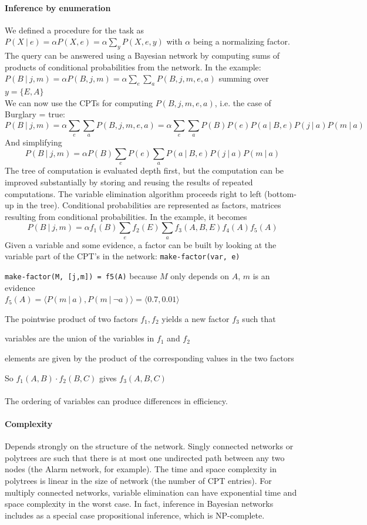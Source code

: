 \documentclass[10pt]{report}
\begin{document}
\paragraph{Inference by enumeration} We defined a procedure for the task as $P(X\:|\:e)=\alpha P(X,e) = \alpha\sum_y P(X,e,y)$ with $\alpha$ being a normalizing factor.\\
The query can be answered using a Bayesian network by computing sums of products of conditional probabilities from the network. In the example: $P(B\:|\:j,m) = \alpha P(B,j,m) = \alpha\sum_e\sum_a P(B,j,m,e,a)$ summing over $y=\{E,A\}$\\
We can now use the CPTs for computing $P(B,j,m,e,a)$, i.e. the case of Burglary = true:
$$P(B\:|\:j,m) = \alpha\sum_e\sum_a P(B,j,m,e,a) = \alpha\sum_e\sum_aP(B)P(e)P(a\:|\:B,e)P(j\:|\:a)P(m\:|\:a)$$
And simplifying
$$P(B\:|\:j,m) = \alpha P(B)\sum_e P(e) \sum_a P(a\:|\:B,e)P(j\:|\:a)P(m\:|\:a)$$
The tree of computation is evaluated depth first, but the computation can be improved substantially by storing and reusing the results of repeated computations. The variable elimination algorithm proceeds right to left (bottom-up in the tree). Conditional probabilities are represented as factors, matrices resulting from conditional probabilities. In the example, it becomes
$$P(B\:|\:j,m) = \alpha f_1(B)\sum_e f_2(E) \sum_a f_3(A,B,E)f_4(A)f_5(A)$$
Given a variable and some evidence, a factor can be built by looking at the variable part of the CPT's in the network: \texttt{make-factor(var, e)}
\begin{list}{}{}
	\item \texttt{make-factor(M, [j,m]) = f5(A)} because $M$ only depends on $A$, $m$ is an evidence\\
	$f_5(A) = \langle P(m\:|\:a),P(m\:|\:\neg a)\rangle = \langle 0.7,0.01\rangle$
\end{list}
The pointwise product of two factors $f_1,f_2$ yields a new factor $f_3$ such that
\begin{list}{}{}
	\item variables are the union of the variables in $f_1$ and $f_2$
	\item elements are given by the product of the corresponding values in the two factors
\end{list}
So $f_1(A,B)\cdot f_2(B,C)$ gives $f_3(A,B,C)$\\\\
The ordering of variables can produce differences in efficiency. 
\paragraph{Complexity} Depends strongly on the structure of the network. Singly connected networks or polytrees are such that there is at most one undirected path between any two nodes (the Alarm network, for example). The time and space complexity in polytrees is linear in the size of network (the number of CPT entries). For multiply connected networks, variable elimination can have exponential time and space complexity in the worst case. In fact, inference in Bayesian networks includes as a special case propositional inference, which is NP-complete.
\end{document}
